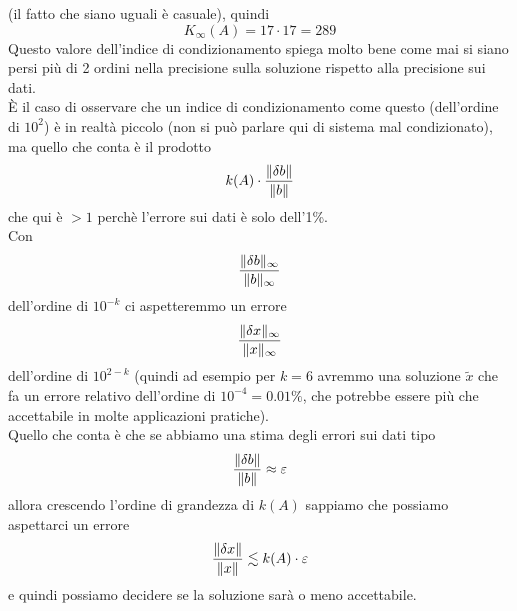 \documentclass[12pt,a4paper]{article}
\DeclarePairedDelimiter{\norma}{\lVert}{\rVert}
\begin{document}
(il fatto che siano uguali è casuale), quindi
\begin{equation*}
    K_\infty(A) = 17 \cdot 17 = 289
\end{equation*}
Questo valore dell'indice di condizionamento spiega molto bene come mai si siano persi più di 2 ordini nella precisione sulla soluzione rispetto alla precisione sui dati.\\
È il caso di osservare che un indice di condizionamento come questo (dell'ordine di $10^2$) è in realtà piccolo (non si può parlare qui di sistema mal condizionato), ma quello che conta è il prodotto
\begin{equation*}
   k(A)\cdot \frac{\norma{\delta b}}{\norma{b}}
\end{equation*} che qui è $>1$ perchè l'errore sui dati è solo dell'1\%.\\Con 
\begin{equation*}
    \frac{\norma{\delta b}_\infty}{\norma{b}_\infty}
\end{equation*} 
dell'ordine di $10^{-k}$ ci aspetteremmo un errore 
\begin{equation*}
    \frac{\norma{\delta x}_\infty}{\norma{x}_\infty} 
\end{equation*}dell'ordine di $10^{2-k}$ (quindi ad esempio per $k=6$ avremmo una soluzione $\tilde{x}$ che fa un errore relativo dell'ordine di $10^{-4}=0.01\%$, che potrebbe essere più che accettabile in molte applicazioni pratiche).\\
Quello che conta è che se abbiamo una stima degli errori sui dati tipo
\begin{equation*}
    \frac{\norma{\delta b}}{\norma{b}}\approx \varepsilon
\end{equation*} allora crescendo l'ordine di grandezza di $k(A)$ sappiamo che possiamo aspettarci un errore 
\begin{equation*}
    \frac{\norma{\delta x}}{\norma{x}}\lesssim k(A)\cdot\varepsilon
\end{equation*}
e quindi possiamo decidere se la soluzione sarà o meno accettabile.
\end{document}

